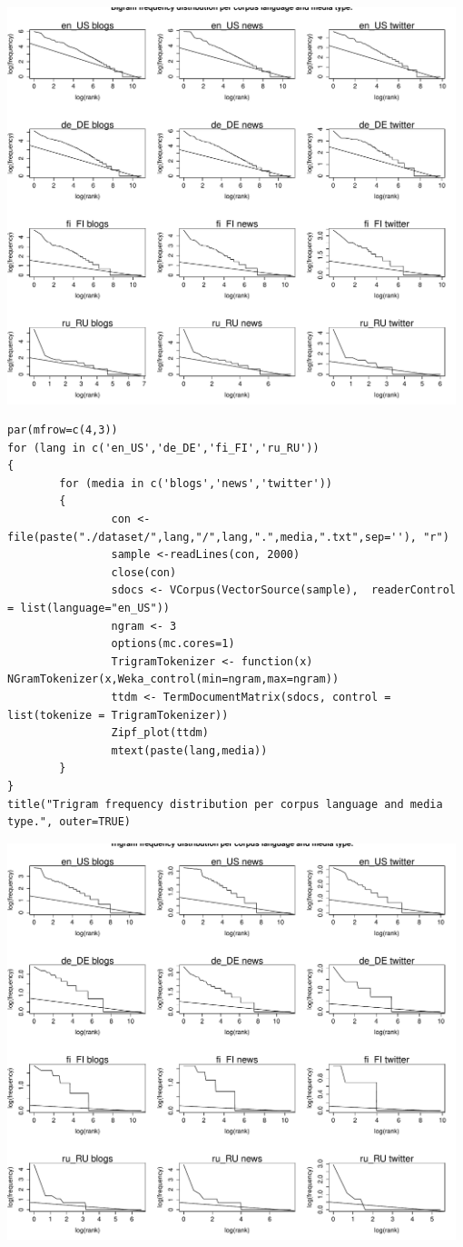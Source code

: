 \documentclass{article}
\begin{document}
\includegraphics[width=0.98\textwidth]{graphics/bigrams_frequency.pdf}

\begin{lstlisting}
par(mfrow=c(4,3))
for (lang in c('en_US','de_DE','fi_FI','ru_RU'))
{
        for (media in c('blogs','news','twitter'))
        {
                con <- file(paste("./dataset/",lang,"/",lang,".",media,".txt",sep=''), "r")
                sample <-readLines(con, 2000)
                close(con)
                sdocs <- VCorpus(VectorSource(sample),  readerControl = list(language="en_US"))
                ngram <- 3
                options(mc.cores=1)
                TrigramTokenizer <- function(x) NGramTokenizer(x,Weka_control(min=ngram,max=ngram))
                ttdm <- TermDocumentMatrix(sdocs, control = list(tokenize = TrigramTokenizer))
                Zipf_plot(ttdm)
                mtext(paste(lang,media))
        }
}
title("Trigram frequency distribution per corpus language and media type.", outer=TRUE)
\end{lstlisting}

\includegraphics[width=0.98\textwidth]{graphics/trigrams_frequency.pdf}
\end{document}

